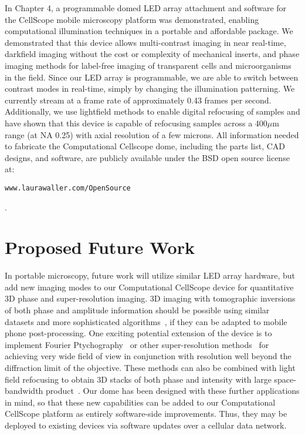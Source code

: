 In Chapter 4, a programmable domed LED array attachment and software for the CellScope mobile microscopy platform was demonstrated, enabling computational illumination techniques in a portable and affordable package. We demonstrated that this device allows multi-contrast imaging in near real-time, darkfield imaging without the cost or complexity of mechanical inserts, and phase imaging methods for label-free imaging of transparent cells and microorganisms in the field. Since our LED array is programmable, we are able to switch between contrast modes in real-time, simply by changing the illumination patterning. We currently stream at a frame rate of approximately 0.43 frames per second. Additionally, we use lightfield methods to enable digital refocusing of samples and have shown that this device is capable of refocusing samples across a 400$\mu$m range (at NA 0.25) with axial resolution of a few microns. All information needed to fabricate the Computational Cellscope dome, including the parts list, CAD designs, and software, are publicly available under the BSD open source license at: \begin{verbatim}www.laurawaller.com/OpenSource\end{verbatim}.

\section{Proposed Future Work}

In portable microscopy, future work will utilize similar LED array hardware, but add new imaging modes to our Computational CellScope device for quantitative 3D phase and super-resolution imaging. 3D imaging with tomographic inversions of both phase and amplitude information should be possible using similar datasets and more sophisticated algorithms~\cite{tian20153d}, if they can be adapted to mobile phone post-processing. One exciting potential extension of the device is to implement Fourier Ptychography~\cite{Zheng2013,Dong:14,Tian2014} or other super-resolution methods~\cite{Zhu2011,Greenbaum17122014} for achieving very wide field of view in conjunction with resolution well beyond the diffraction limit of the objective. These methods can also be combined with light field refocusing to obtain 3D stacks of both phase and intensity with large space-bandwidth product~\cite{tian20153d}. Our dome has been designed with these further applications in mind, so that these new capabilities can be added to our Computational CellScope platform as entirely software-side improvements. Thus, they may be deployed to existing devices via software updates over a cellular data network.

